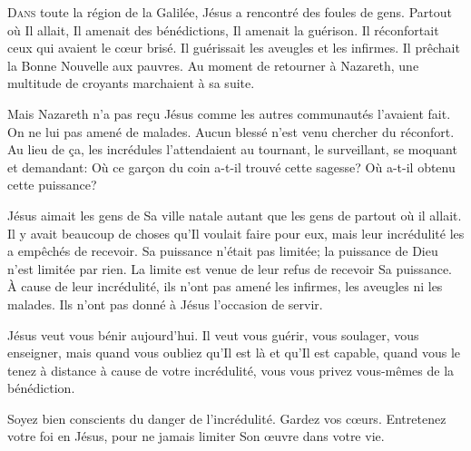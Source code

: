\dvrule







\lettrine{D}{ans} toute la région de la Galilée,
 Jésus a rencontré des foules de gens. Partout où Il allait,
 Il amenait des bénédictions, Il amenait la guérison.
 Il réconfortait ceux qui avaient le c\oe{}ur brisé.
 Il guérissait les aveugles et les infirmes.
 Il prêchait la Bonne Nouvelle aux pauvres.
 Au moment de retourner à Nazareth, une multitude de croyants
 marchaient à sa suite.

Mais Nazareth n'a pas re\c{c}u Jésus comme les autres communautés
 l'avaient fait. On ne lui pas amené de malades.
 Aucun blessé n'est venu chercher du réconfort.
 Au lieu de \c{c}a, les incrédules l'attendaient au tournant,
 le surveillant, se moquant et demandant:
 \Og Où ce gar\c{c}on du coin a-t-il trouvé cette sagesse?
 Où a-t-il obtenu cette puissance? \Fg{}


Jésus aimait les gens de Sa ville natale autant que les gens
 de partout où il allait. Il y avait beaucoup de choses
 qu'Il voulait faire pour eux, mais leur incrédulité
 les a empêchés de recevoir. Sa puissance n'était pas limitée;
 la puissance de Dieu n'est limitée par rien.
 La limite est venue de leur refus de recevoir Sa puissance.
 À cause de leur incrédulité, ils n'ont pas amené les infirmes,
 les aveugles ni les malades. Ils n'ont pas donné à Jésus l'occasion de servir.

Jésus veut vous bénir aujourd'hui. Il veut vous guérir, vous soulager,
 vous enseigner, mais quand vous oubliez qu'Il est là et qu'Il est capable,
 quand vous le tenez à distance à cause de votre incrédulité,
 vous vous privez vous-mêmes de la bénédiction.

Soyez bien conscients du danger de l'incrédulité. Gardez vos c\oe{}urs.
 Entretenez votre foi en Jésus,
 pour ne jamais limiter Son \oe{}uvre dans votre vie.

